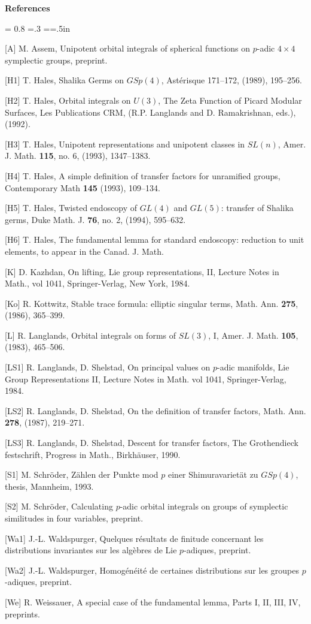 \documentclass{amsart}
\begin{document}
\bigskip
\centerline{\bf References}
\bigskip

{
\baselineskip = 0.8\baselineskip
\parskip=.3\baselineskip
\everypar={\hangindent=.5in}

[A]  M. Assem, Unipotent orbital integrals of spherical
	functions on $p$-adic $4\times 4$ symplectic
	groups, preprint.

[H1] T. Hales, Shalika Germs on $GSp(4)$, Ast\'erisque 171--172,
	(1989), 195--256.

[H2] T. Hales, Orbital integrals on $U(3)$, The Zeta Function
	of Picard Modular Surfaces, Les Publications CRM,
	(R.P. Langlands and D. Ramakrishnan, eds.), (1992).

[H3] T. Hales, Unipotent representations and unipotent classes
	in $SL(n)$, Amer. J. Math. {\bf 115}, no. 6, (1993),
	1347--1383.

[H4] T. Hales, A simple definition of transfer factors for unramified
	groups, Contemporary Math {\bf 145} (1993), 109--134.

[H5] T. Hales, Twisted endoscopy of $GL(4)$ and $GL(5)$: transfer
	of Shalika germs, Duke Math. J. {\bf 76}, no. 2, (1994),
	595--632.

[H6] T. Hales, The fundamental lemma for standard endoscopy:
	reduction to unit elements, to appear in the Canad. J. Math.

[K] D. Kazhdan, On lifting, Lie group representations, II,
	Lecture Notes in Math., vol 1041, Springer-Verlag,
	New York, 1984.

[Ko] R. Kottwitz, Stable trace formula: elliptic singular
	terms, Math. Ann. {\bf 275}, (1986), 365--399.

[L]   R. Langlands, Orbital integrals on forms of $SL(3)$, I,
	Amer. J. Math. {\bf 105}, (1983), 465--506.

[LS1] R. Langlands, D. Shelstad, On principal values on $p$-adic
	manifolds, Lie Group Representations II, 
	Lecture Notes in Math. vol 1041, Springer-Verlag, 1984.

[LS2]  R. Langlands, D. Shelstad,  On the definition of transfer factors, Math. Ann.
	{\bf 278}, (1987), 219--271.

[LS3]  R. Langlands, D. Shelstad,  Descent for transfer factors, The Grothendieck
	festschrift, Progress in Math., Birkh\"auser, 1990.

[S1]  M. Schr\"oder, Z\"ahlen der Punkte mod $p$ einer
	Shimuravariet\"at zu $GSp(4)$, thesis, Mannheim, 1993.

[S2]  M. Schr\"oder, Calculating $p$-adic orbital integrals on groups
	of symplectic similitudes in four variables,
	preprint.

[Wa1]  J.-L. Waldspurger, Quelques r\'esultats de finitude
	concernant les distributions invariantes sur
	les alg\`ebres de Lie $p$-adiques, preprint.


[Wa2] J.-L. Waldspurger, Homog\'en\'eit\'e de certaines
	distributions sur les groupes $p$-adiques, preprint.

[We]  R. Weissauer, A special case of the fundamental
	lemma, Parts I, II, III, IV, preprints.

}
\end{document}
